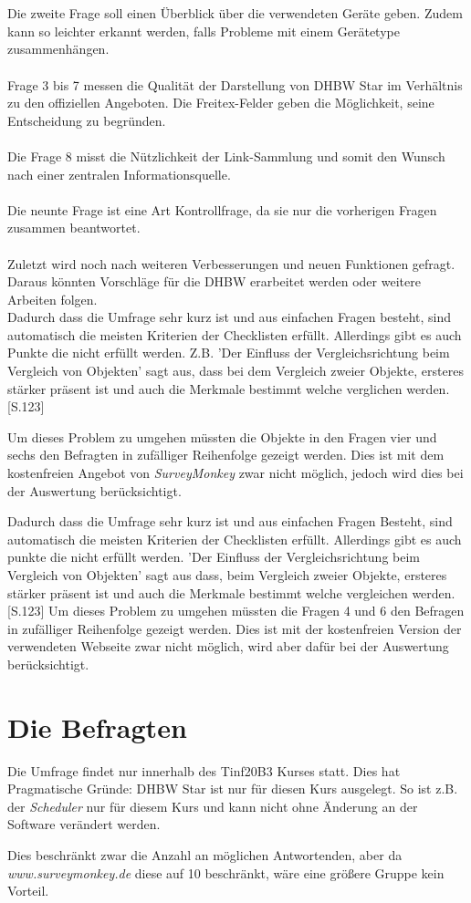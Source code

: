 \\\\
Die zweite Frage soll einen Überblick über die verwendeten Geräte geben. Zudem kann so leichter erkannt werden, falls Probleme mit einem Gerätetype zusammenhängen.
\\\\
Frage 3 bis 7 messen die Qualität der Darstellung von DHBW Star im Verhältnis zu den offiziellen Angeboten. Die Freitex-Felder geben die Möglichkeit, seine Entscheidung zu begründen.
\\\\
Die Frage 8 misst die Nützlichkeit der Link-Sammlung und somit den Wunsch nach einer zentralen Informationsquelle.
\\\\
Die neunte Frage ist eine Art Kontrollfrage, da sie nur die vorherigen Fragen zusammen beantwortet.
\\\\
Zuletzt wird noch nach weiteren Verbesserungen und neuen Funktionen gefragt. Daraus könnten Vorschläge für die DHBW erarbeitet werden oder weitere Arbeiten folgen.
\\
\label{vergleichsproblem}
Dadurch dass die Umfrage sehr kurz ist und aus einfachen Fragen besteht, sind automatisch die meisten Kriterien der Checklisten erfüllt. Allerdings gibt es auch Punkte die nicht erfüllt werden. Z.B. 'Der Einfluss der Vergleichsrichtung beim Vergleich von Objekten' sagt aus, dass bei dem Vergleich zweier Objekte, ersteres stärker präsent ist und auch die Merkmale bestimmt welche verglichen werden. \cite{fragebogenRolf} [S.123]

Um dieses Problem zu umgehen müssten die Objekte in den Fragen vier und sechs den Befragten in zufälliger Reihenfolge gezeigt werden. Dies ist mit dem kostenfreien Angebot von \emph{SurveyMonkey} zwar nicht möglich, jedoch wird dies bei der Auswertung berücksichtigt.

Dadurch dass die Umfrage sehr kurz ist und aus einfachen Fragen Besteht, sind automatisch die meisten Kriterien der Checklisten erfüllt. Allerdings gibt es auch punkte die nicht erfüllt werden. 'Der Einfluss der Vergleichsrichtung beim Vergleich von Objekten' sagt aus dass, beim Vergleich zweier Objekte, ersteres stärker präsent ist und auch die Merkmale bestimmt welche vergleichen werden. \cite{fragebogenRolf} [S.123]
Um dieses Problem zu umgehen müssten die Fragen 4 und 6 den Befragen in zufälliger Reihenfolge gezeigt werden. Dies ist mit der kostenfreien Version der verwendeten Webseite zwar nicht möglich,
wird aber dafür bei der Auswertung berücksichtigt.

\section{Die Befragten}
Die Umfrage findet nur innerhalb des Tinf20B3 Kurses statt. Dies hat Pragmatische Gründe: DHBW Star ist nur für diesen Kurs ausgelegt. So ist z.B. der \emph{Scheduler} nur für diesem Kurs und kann nicht ohne Änderung an der Software verändert werden.

Dies beschränkt zwar die Anzahl an möglichen Antwortenden, aber da \emph{www.surveymonkey.de} diese auf 10 beschränkt, wäre eine größere Gruppe kein Vorteil.